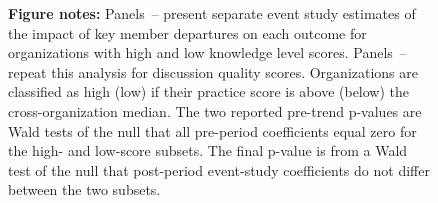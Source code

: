 \begin{figure}[ht]
  \begin{minipage}{1\textwidth}
    \vspace{0.6em}
    \textbf{Figure notes:}
    Panels~-- present separate event study estimates of the impact of key member departures on each outcome for organizations with high and low knowledge level scores.
    Panels~-- repeat this analysis for discussion quality scores.
    Organizations are classified as high (low) if their practice score is above (below) the cross-organization median.
    \EventStudySharedNotes
    The two reported pre-trend p-values are Wald tests of the null that all pre-period coefficients equal zero for the high- and low-score subsets.
    The final p-value is from a Wald test of the null that post-period event-study coefficients do not differ between the two subsets.
  \end{minipage}
\end{figure}
